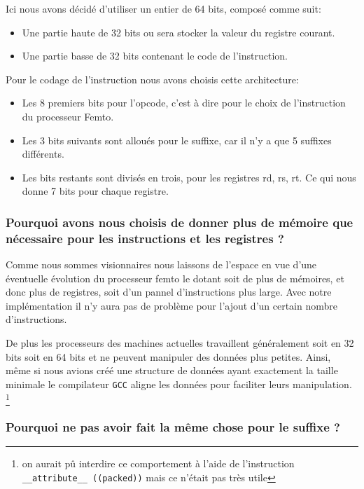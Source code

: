 \documentclass[11pt,a4paper]{article}
\begin{document}
Ici nous avons décidé d'utiliser un entier de 64 bits, composé comme suit:
\begin{itemize}
\item Une partie haute de 32 bits ou sera stocker la valeur du registre courant.
\item Une partie basse de 32 bits contenant le code de l'instruction.
\end{itemize}

Pour le codage de l'instruction nous avons choisis cette architecture:
\begin{itemize}
\item Les 8 premiers bits pour l'opcode, c'est à dire pour le choix de l'instruction du processeur
Femto.
\end{itemize}

\begin{itemize}
\item Les 3 bits suivants sont alloués pour le suffixe, car il n'y a que 5 suffixes différents.
\item Les bits restants sont divisés en trois, pour les registres rd, rs, rt. Ce qui nous donne 7
bits pour chaque registre.
\end{itemize}


\subsubsection*{Pourquoi avons nous choisis de donner plus de mémoire que nécessaire pour les instructions et les
registres ?}

Comme nous sommes visionnaires nous laissons de l'espace en vue d'une éventuelle évolution du
processeur femto le dotant soit de plus de mémoires, et donc plus de registres, soit d'un pannel
d'instructions plus large. Avec notre implémentation il n'y aura pas de problème pour
l'ajout d'un certain nombre d'instructions.

De plus les processeurs des machines actuelles travaillent généralement soit en 32 bits soit en
64 bits et ne peuvent manipuler des données plus petites. Ainsi, même si nous avions créé une structure
de données ayant exactement la taille minimale le compilateur \texttt{GCC} aligne les données pour faciliter
leurs manipulation. \footnote{on aurait pû interdire ce comportement à l'aide de l'instruction \texttt{\_\_attribute\_\_ ((packed))}
mais ce n'était pas très utile}

\subsubsection*{Pourquoi ne pas avoir fait la même chose pour le suffixe ?}
\end{document}
